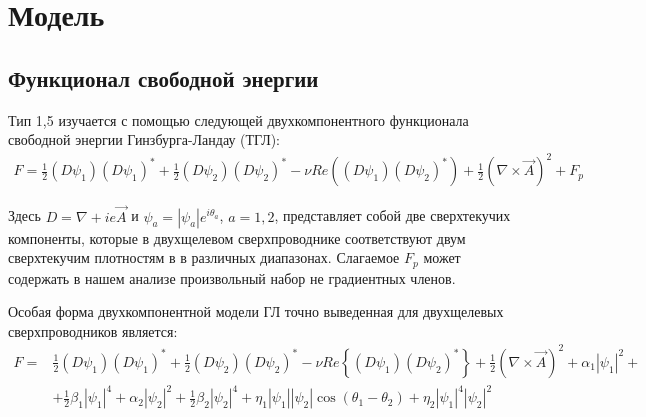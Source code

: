 \chapter{Модель}

\section{Функционал свободной энергии}

Тип 1,5 изучается с помощью следующей двухкомпонентного функционала свободной 
энергии Гинзбурга-Ландау (ТГЛ):
\begin{align}
    F = \frac{1}{2}(D\psi_1)(D\psi_1)^* + \frac{1}{2}(D\psi_2)(D\psi_2)^* - 
        \nu Re\left( (D\psi_1)(D\psi_2)^* \right) + 
        \frac{1}{2}\left(\nabla\times\vec{A}\right)^2 + F_p
    \label{eq:1}
\end{align}

Здесь \( D = \nabla + ie\vec{A} \) и \( \psi_a = |\psi_a|e^{i\theta_a} \), 
\( a = 1,2 \), представляет собой две сверхтекучих компоненты, которые в 
двухщелевом сверхпроводнике соответствуют двум сверхтекучим плотностям в 
в различных диапазонах. Слагаемое \( F_p \) может содержать в нашем 
анализе произвольный набор не градиентных членов.

Особая форма двухкомпонентной модели ГЛ точно выведенная 
\cite{bib:8,bib:9,bib:10} для двухщелевых сверхпроводников является:
\begin{align}
    F = & \frac{1}{2}(D\psi_1)(D\psi_1)^* + \frac{1}{2}(D\psi_2)(D\psi_2)^* - 
        \nu Re\left\{ (D\psi_1)(D\psi_2)^* \right\} + 
        \frac{1}{2}\left(\nabla\times\vec{A}\right)^2 + \alpha_1|\psi_1|^2 + 
        \nonumber \\
        & + \frac{1}{2}\beta_1|\psi_1|^4 + \alpha_2|\psi_2|^2 + 
        \frac{1}{2}\beta_2|\psi_2|^4 + \eta_1|\psi_1||\psi_2|
        \cos(\theta_1-\theta_2) + \eta_2|\psi_1|^4|\psi_2|^2
    \label{eq:2}
\end{align}

